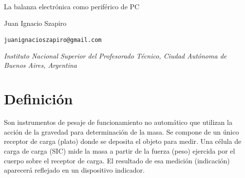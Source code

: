 \documentclass{article}
\renewenvironment{quote}{\list{}{\leftmargin=1.5cm\rightmargin=0cm}\item\relax}{\endlist}
\renewenvironment{abstract}{\list{}{\leftmargin=1.5cm\rightmargin=0cm}\item\relax}{\endlist}
\renewenvironment{keyword}{\list{}{\leftmargin=1.5cm\rightmargin=0cm}\item\relax}{\endlist}
\begin{document}
    \begin{center}
        {\fontsize{24pt}{24pt}\selectfont La balanza electrónica como periférico de PC} 

        \hspace{1.5cm}
        
        {Juan Ignacio Szapiro}

        \fontsize{9pt}{9pt}\texttt{juanignacioszapiro@gmail.com}

        \fontsize{10pt}{10pt}\textit{Instituto Nacional Superior del Profesorado Técnico, Ciudad Autónoma de Buenos Aires, Argentina}
        
        \hspace{1.5cm}
    \end{center}
    
   
    \renewcommand{\abstractname}{\vspace{-\baselineskip}}
    \begin{abstract}

    \hspace{1.5cm}
    \end{abstract}
    
    \begin{keyword}
    \end{keyword}
    
    \section{Definición}
        { }
        \begin{quote}
        Son instrumentos de pesaje de funcionamiento no automático que utilizan la acción de la gravedad para determinación de la masa. Se compone de un único receptor de carga (plato) donde se deposita el objeto para medir. Una célula de carga de carga (SIC) mide la masa a partir de la fuerza (peso) ejercida por el cuerpo sobre el receptor de carga. El resultado de
        esa medición (indicación) aparecerá reflejado en un dispositivo indicador.
        \end{quote}
\end{document}
